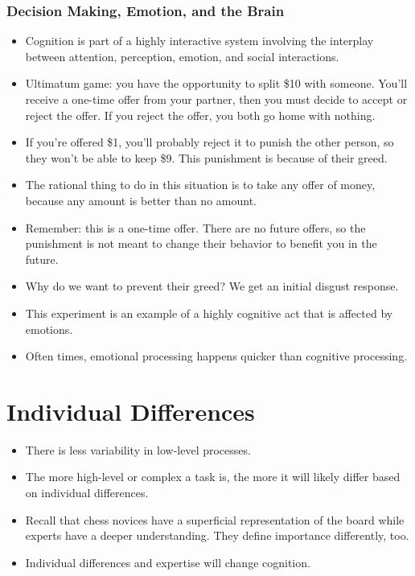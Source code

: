 \documentclass[]{article}
\begin{document}
			\subsubsection{Decision Making, Emotion, and the Brain}
				\begin{itemize}
					\item Cognition is part of a highly interactive system involving the interplay between attention, perception, emotion, and social interactions.
					\item Ultimatum game: you have the opportunity to split \$10 with someone. You'll receive a one-time offer from your partner, then you must decide to accept or reject the offer. If you reject the offer, you both go home with nothing.
					\item If you're offered \$1, you'll probably reject it to punish the other person, so they won't be able to keep \$9. This punishment is because of their greed.
					\item The rational thing to do in this situation is to take any offer of money, because any amount is better than no amount.
					\item Remember: this is a one-time offer. There are no future offers, so the punishment is not meant to change their behavior to benefit you in the future.
					\item Why do we want to prevent their greed? We get an initial disgust response.
					\item This experiment is an example of a highly cognitive act that is affected by emotions.
					\item Often times, emotional processing happens quicker than cognitive processing.
				\end{itemize}

	\section{Individual Differences}
		\begin{itemize}
			\item There is less variability in low-level processes.
			\item The more high-level or complex a task is, the more it will likely differ based on individual differences.
			\item Recall that chess novices have a superficial representation of the board while experts have a deeper understanding. They define importance differently, too.
			\item Individual differences and expertise will change cognition.
		\end{itemize}
\end{document}
